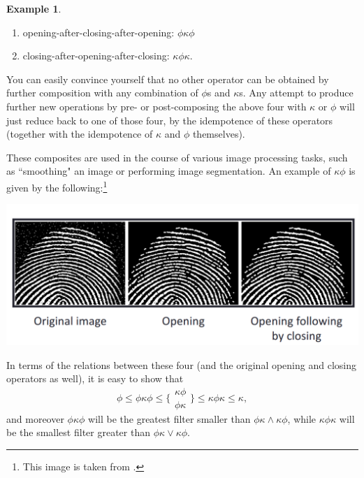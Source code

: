 \documentclass[a4paper]{book}
\theoremstyle{definition}
\newtheorem{example}{Example}[section]
\theoremstyle{definition}
\theoremstyle{definition}
\theoremstyle{theorem}
\theoremstyle{definition}
\begin{document}
\begin{example}
\begin{enumerate}
		\item opening-after-closing-after-opening: $ \phi \kappa \phi$
		\item closing-after-opening-after-closing: $\kappa \phi \kappa$.
	\end{enumerate} 
	You can easily convince yourself that no other operator can be obtained by further composition with any combination of $\phi$s and $\kappa$s. Any attempt to produce further new operations by pre- or post-composing the above four with $\kappa$ or $\phi$ will just reduce back to one of those four, by the idempotence of these operators (together with the idempotence of $\kappa$ and $\phi$ themselves). \par 
	These composites are used in the course of various image processing tasks, such as ``smoothing" an image or performing image segmentation. An example of $\kappa \phi$ is given by the following:\footnote{This image is taken from \cite{bobick_binary_2014}.}
	\begin{center}
		\includegraphics*[scale=0.25]{FingerprintExample.png}
	\end{center}
	In terms of the relations between these four (and the original opening and closing operators as well), it is easy to show that 
	\begin{equation*}
	\phi \leq \phi \kappa \phi \leq \{ \begin{smallmatrix}
	\kappa \phi \\ 
	\phi \kappa 
	\end{smallmatrix} \} \leq \kappa \phi \kappa \leq \kappa,  
	\end{equation*}
	and moreover $\phi \kappa \phi$ will be the greatest filter smaller than $\phi \kappa \wedge \kappa \phi$, while $\kappa \phi \kappa$ will be the smallest filter greater than $\phi \kappa \vee \kappa \phi$.
\end{example} 
\end{document}
